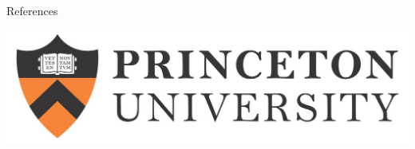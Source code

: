 \documentclass[final]{beamer}
\newlength{\onecolwid}
\begin{document}
\begin{frame}[t]
\begin{columns}[t]
\begin{column}{\onecolwid}
\begin{block}{References}
\small



\end{block}

\begin{center}
\includegraphics[width=0.5\linewidth]{PU-long.jpg}
\end{center}


\end{column} %

\end{columns} %

\end{frame} %
\end{document}
